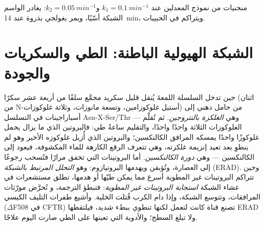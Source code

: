 \begin{omfigure}

{\small منحنيات  من نموذج المعدلين عند $k_{1} =
\qty{0.1}{min^{-1}}$ و$k_{2} = \qty{0.05}{min^{-1}}$: يغادر الواسم
الشبكة أسّيًا، ويمر بغولجي بذروة عند
\qty{14}{min}، ويتراكم في الحبيبات.}
\end{omfigure}

\section{الشبكة الهيولية الباطنة: الطي والسكريات والجودة}

\begin{definition}\label{def:b3:membrane-traffic:glycosylation}
حين تدخل السلسلة اللمعةَ يُنقل قليل سكريد مجمَّع سلفًا من
أربعة عشر سكرًا (اثنان من N-أستيل غلوكوزامين، وتسعة مانوزات، وثلاثة
غلوكوزات) من حامل دهني إلى أسباراجينات في
التسلسل Asn-X-Ser/Thr --- وهي \emph{الغلكزة بالنتروجين}. ثم تُقلّم
الغلوكوزات الثلاثة واحدًا واحدًا، والتقليم ساعةُ طي:
فالبروتين الذي ما يزال يحمل غلوكوزًا واحدًا يمسكه المرافق الكالنكسين؛
والبروتين الذي أُزيل غلوكوزه الأخير وهو لم ينطوِ
بعد تعيد إنزيمة غلكزته، وهي تتعرف الرقع الكارهة للماء
المكشوفة، فيعود إلى الكالنكسين --- وهي \emph{دورة
الكالنكسين}. أما البروتينات التي تخفق مرارًا فتُسحب رجوعًا إلى العصارة،
وتُؤبقن ويهدمها البروتيازوم: وهو \emph{التحلل المرتبط
بالشبكة} (ERAD). وحين تتراكم البروتينات غير المطوية أسرع مما
يمكن طيّها أو هدمها، تطلق مستشعرات في غشاء الشبكة
\emph{استجابة البروتينات غير المطوية}: فتبطؤ الترجمة، و
تُحرَّض مورّثات المرافقات، وتتوسع الشبكة، وإذا دام الكرب
قُتلت الخلية. وأشيع طفرات التليف الكيسي
($\Delta$F508 في CFTR) تصنع قناة كانت لتعمل لكنها تنطوي ببطء
شديد، فيلتقطها ERAD ولا تبلغ السطح؛ والأدوية التي
تعينها على الطي صارت اليوم علاجًا.
\end{definition}

